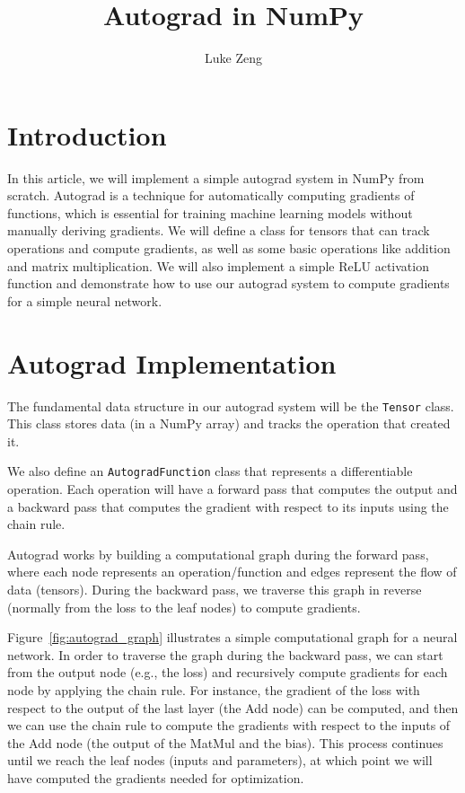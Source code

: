\documentclass{article}
\title{Autograd in NumPy}
\author{Luke Zeng}
\date{}
\begin{document}
\maketitle

\section{Introduction}
In this article, we will implement a simple autograd system in NumPy from scratch. Autograd is a technique for automatically computing gradients of functions, which is essential for training machine learning models without manually deriving gradients. We will define a class for tensors that can track operations and compute gradients, as well as some basic operations like addition and matrix multiplication. We will also implement a simple ReLU activation function and demonstrate how to use our autograd system to compute gradients for a simple neural network.

\section{Autograd Implementation}
The fundamental data structure in our autograd system will be the \texttt{Tensor} class. This class stores data (in a NumPy array) and tracks the operation that created it.

We also define an \texttt{AutogradFunction} class that represents a differentiable operation. Each operation will have a forward pass that computes the output and a backward pass that computes the gradient with respect to its inputs using the chain rule.

Autograd works by building a computational graph during the forward pass, where each node represents an operation/function and edges represent the flow of data (tensors). During the backward pass, we traverse this graph in reverse (normally from the loss to the leaf nodes) to compute gradients.

Figure~\ref{fig:autograd_graph} illustrates a simple computational graph for a neural network. In order to traverse the graph during the backward pass, we can start from the output node (e.g., the loss) and recursively compute gradients for each node by applying the chain rule. For instance, the gradient of the loss with respect to the output of the last layer (the Add node) can be computed, and then we can use the chain rule to compute the gradients with respect to the inputs of the Add node (the output of the MatMul and the bias). This process continues until we reach the leaf nodes (inputs and parameters), at which point we will have computed the gradients needed for optimization.
\end{document}
